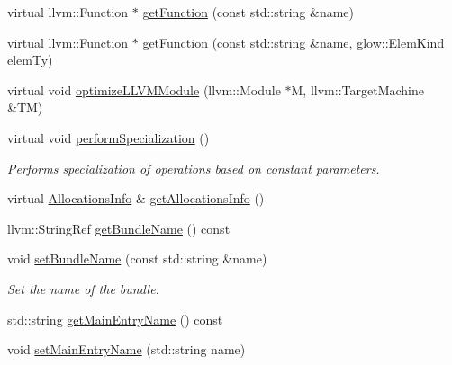 \begin{DoxyCompactItemize}
\item 
virtual llvm\+::\+Function $\ast$ \hyperlink{classglow_1_1_l_l_v_m_i_r_gen_a573dc0804d60a5a7211f11f5d9e9b7b1}{get\+Function} (const std\+::string \&name)
\item 
virtual llvm\+::\+Function $\ast$ \hyperlink{classglow_1_1_l_l_v_m_i_r_gen_ad7b34709fef04c6318ce086e2128ccb7}{get\+Function} (const std\+::string \&name, \hyperlink{namespaceglow_ab92e14a94329daf4083db670e95fbcdf}{glow\+::\+Elem\+Kind} elem\+Ty)
\item 
virtual void \hyperlink{classglow_1_1_l_l_v_m_i_r_gen_a044469a2bbd62d2ce24c1da0fce621a2}{optimize\+L\+L\+V\+M\+Module} (llvm\+::\+Module $\ast$M, llvm\+::\+Target\+Machine \&TM)
\item 
\mbox{\label{classglow_1_1_l_l_v_m_i_r_gen_a9021a869c4d7d8d79089d947c898cae5}} 
virtual void \hyperlink{classglow_1_1_l_l_v_m_i_r_gen_a9021a869c4d7d8d79089d947c898cae5}{perform\+Specialization} ()
\begin{DoxyCompactList}\small\item\em Performs specialization of operations based on constant parameters. \end{DoxyCompactList}\item 
virtual \hyperlink{structglow_1_1_allocations_info}{Allocations\+Info} \& \hyperlink{classglow_1_1_l_l_v_m_i_r_gen_a493cc6f5ebe4fae57ccce7c7bec07ead}{get\+Allocations\+Info} ()
\item 
llvm\+::\+String\+Ref \hyperlink{classglow_1_1_l_l_v_m_i_r_gen_ad98b7ebc89eb4f9ff63466c190ac6935}{get\+Bundle\+Name} () const
\item 
\mbox{\label{classglow_1_1_l_l_v_m_i_r_gen_a1129e6ac613511aa059b44b83026a831}} 
void \hyperlink{classglow_1_1_l_l_v_m_i_r_gen_a1129e6ac613511aa059b44b83026a831}{set\+Bundle\+Name} (const std\+::string \&name)
\begin{DoxyCompactList}\small\item\em Set the name of the bundle. \end{DoxyCompactList}\item 
std\+::string \hyperlink{classglow_1_1_l_l_v_m_i_r_gen_a7d552d8a207ea84b2e1c24585646df74}{get\+Main\+Entry\+Name} () const
\item 
\mbox{\label{classglow_1_1_l_l_v_m_i_r_gen_a8a4007c0b6dffa3ea7ab30c859ad0e72}} 
void \hyperlink{classglow_1_1_l_l_v_m_i_r_gen_a8a4007c0b6dffa3ea7ab30c859ad0e72}{set\+Main\+Entry\+Name} (std\+::string name)

\end{DoxyCompactItemize}
